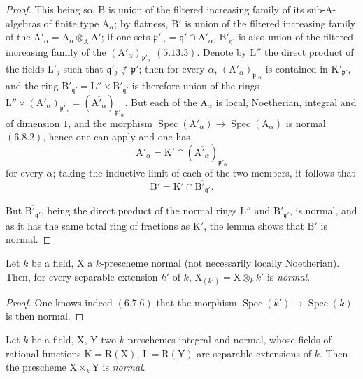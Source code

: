 \begin{proof}
This being so, $\mathrm{B}$ is union of the filtered increasing family of its sub-$\mathrm{A}$-algebras of finite type
$\mathrm{A}_\alpha$; by flatness, $\mathrm{B}'$ is union of the filtered increasing family of the $\mathrm{A}'_\alpha=\mathrm{A}_\alpha\otimes_\mathrm{A}\mathrm{A}'$;
if one sets $\mathfrak{p}'_\alpha=\mathfrak{q}'\cap\mathrm{A}'_\alpha$, $\mathrm{B}'_{\mathfrak{q}'}$ is also union of the filtered increasing family of the $(\mathrm{A}'_\alpha)_{\mathfrak{p}'_\alpha}$
$(5.13.3)$. Denote by $\mathrm{L}''$ the direct product of the fields $\mathrm{L}'_j$ such that $\mathfrak{q}'_j\not\subset\mathfrak{p}'$; then for
every $\alpha$, $(\mathrm{A}'_\alpha)_{\mathfrak{p}'_\alpha}$ is contained in $\mathrm{K}'_{\mathfrak{p}'}$, and the ring $\overline{\mathrm{B}'_{\mathfrak{q}'}}=\mathrm{L}''\times\mathrm{B}'_{\mathfrak{q}'}$ is therefore union of the
rings $\mathrm{L}''\times(\mathrm{A}'_\alpha)_{\mathfrak{p}'_\alpha}=(\overline{\mathrm{A}'_\alpha})_{\mathfrak{p}'_\alpha}$. But each of the $\mathrm{A}_\alpha$ is local, Noetherian, integral and of
dimension $1$, and the morphism $\operatorname{Spec}(\mathrm{A}'_\alpha)\to\operatorname{Spec}(\mathrm{A}_\alpha)$ is normal $(6.8.2)$, hence one can
apply  and one has
\[
  \mathrm{A}'_\alpha=\mathrm{K}'\cap(\overline{\mathrm{A}'_\alpha})_{\mathfrak{p}'_\alpha}
\]
for every $\alpha$; taking the inductive limit of each of the two members, it follows that
\[
  \mathrm{B}'=\mathrm{K}'\cap\overline{\mathrm{B}'_{\mathfrak{q}'}}.
\]

But $\overline{\mathrm{B}'_{\mathfrak{q}'}}$, being the direct product of the normal rings $\mathrm{L}''$ and $\mathrm{B}'_{\mathfrak{q}'}$, is normal, and as
it has the same total ring of fractions as $\mathrm{K}'$, the lemma  shows that $\mathrm{B}'$ is normal.
\end{proof}

\begin{corollary}[6.14.2]
\label{IV.6.14.2}
Let $k$ be a field, $\mathrm{X}$ a $k$-prescheme normal (not necessarily
locally Noetherian). Then, for every separable extension $k'$ of $k$, $\mathrm{X}_{(k')}=\mathrm{X}\otimes_k k'$ is
\emph{normal}.
\end{corollary}

\begin{proof}
One knows indeed $(6.7.6)$ that the morphism $\operatorname{Spec}(k')\to\operatorname{Spec}(k)$ is then normal.
\end{proof}

\begin{corollary}[6.14.3]
\label{IV.6.14.3}
Let $k$ be a field, $\mathrm{X}$, $\mathrm{Y}$ two $k$-preschemes integral and normal,
whose fields of rational functions $\mathrm{K}=\mathrm{R}(\mathrm{X})$, $\mathrm{L}=\mathrm{R}(\mathrm{Y})$ are separable extensions of $k$.
Then the prescheme $\mathrm{X}\times_k\mathrm{Y}$ is \emph{normal}.
\end{corollary}

